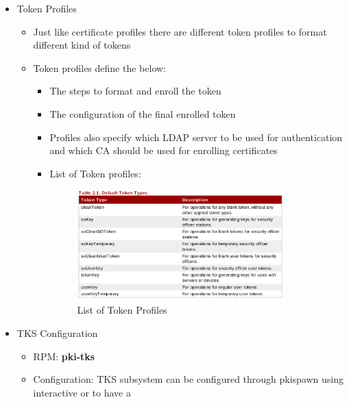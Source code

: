 \documentclass[12pt]{report}
\begin{document}
\begin{itemize}
\begin{itemize}
\begin{itemize}
                        \end{itemize}
                    \item Token Profiles
                        \begin{itemize}
                            \item Just like certificate profiles there are different token profiles to format different kind of tokens 
                            \item Token profiles define the below:
                                \begin{itemize}
                                    \item The steps to format and enroll the token
                                    \item The configuration of the final enrolled token
                                    \item Profiles also specify which LDAP server to be used for authentication and 
                                        which CA should be used for enrolling certificates
                                    \item List of Token profiles:
                                        \begin{figure}[H]
                                            \centering
                                            \includegraphics[width=80mm]{Images/tokenprofiles1.png}
                                            \caption{List of Token Profiles}
                                        \end{figure}
                                \end{itemize}
                        \end{itemize}
                    \item TKS Configuration 
                        \begin{itemize}
                            \item RPM: \textbf{pki-tks}
                            \item Configuration: TKS subsystem can be configured through pkispawn using interactive or to have a 

\end{itemize}
\end{itemize}
\end{itemize}
\end{document}
